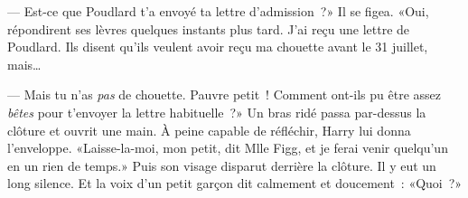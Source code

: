 --- Est-ce que Poudlard t'a envoyé ta lettre d'admission~?»
Il se figea.
«Oui, répondirent ses lèvres quelques instants plus tard. J'ai reçu une lettre de Poudlard. Ils disent qu'ils veulent avoir reçu ma chouette avant le 31 juillet, mais…

--- Mais tu n'as \emph{pas} de chouette. Pauvre petit~! Comment ont-ils pu être assez \emph{bêtes} pour t'envoyer la lettre habituelle~?»
Un bras ridé passa par-dessus la clôture et ouvrit une main. À peine capable de réfléchir, Harry lui donna l'enveloppe.
«Laisse-la-moi, mon petit, dit Mlle Figg, et je ferai venir quelqu'un en un rien de temps.»
Puis son visage disparut derrière la clôture.
Il y eut un long silence.
Et la voix d'un petit garçon dit calmement et doucement~: «Quoi~?»

